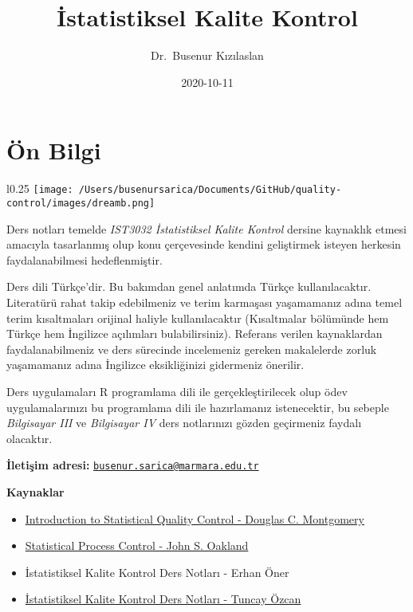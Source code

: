 \documentclass[
]{book}
\title{İstatistiksel Kalite Kontrol}
\author{Dr.~Busenur Kızılaslan}
\date{2020-10-11}
\begin{document}
\maketitle

{
\setcounter{tocdepth}{1}
\tableofcontents
}
\hypertarget{uxf6n-bilgi}{%
\chapter{Ön Bilgi}\label{uxf6n-bilgi}}



\begin{wrapfigure}{l}{0.25\textwidth}
\texttt{[image: /Users/busenursarica/Documents/GitHub/quality-control/images/dreamb.png]}
\end{wrapfigure}

Ders notları temelde \emph{IST3032 İstatistiksel Kalite Kontrol} dersine kaynaklık etmesi amacıyla tasarlanmış olup konu çerçevesinde kendini geliştirmek isteyen herkesin faydalanabilmesi hedeflenmiştir.


Ders dili Türkçe'dir. Bu bakımdan genel anlatımda Türkçe kullanılacaktır. Literatürü rahat takip edebilmeniz ve terim karmaşası yaşamamanız adına temel terim kısaltmaları orijinal haliyle kullanılacaktır (Kısaltmalar bölümünde hem Türkçe hem İngilizce açılımları bulabilirsiniz). Referans verilen kaynaklardan faydalanabilmeniz ve ders sürecinde incelemeniz gereken makalelerde zorluk yaşamamanız adına İngilizce eksikliğinizi gidermeniz önerilir.

Ders uygulamaları R programlama dili ile gerçekleştirilecek olup ödev uygulamalarınızı bu programlama dili ile hazırlamanız istenecektir, bu sebeple \emph{Bilgisayar III} ve \emph{Bilgisayar IV} ders notlarınızı gözden geçirmeniz faydalı olacaktır.

\vspace{0.3cm}

\textbf{İletişim adresi:} \href{mailto:busenur.sarica@marmara.edu.tr}{\nolinkurl{busenur.sarica@marmara.edu.tr}}

\vspace{0.3cm}

\textbf{Kaynaklar}

\begin{itemize}
\item
  \href{http://endustri.eskisehir.edu.tr/ipoyraz/TKY302/icerik/text\%20book_montgomery_6th\%20edition.pdf}{Introduction to Statistical Quality Control - Douglas C. Montgomery}
\item
  \href{http://www.diliev.com/Home/materiali/KHEA/referati/6812268-Statistical-Process-Control-eBook-VG.pdf}{Statistical Process Control - John S. Oakland}
\item
  İstatistiksel Kalite Kontrol Ders Notları - Erhan Öner
\item
  \href{http://auzefkitap.istanbul.edu.tr/kitap/endustrimuhlt_ue/istatistikselkalitekontrolu.pdf}{İstatistiksel Kalite Kontrol Ders Notları - Tuncay Özcan}
\end{itemize}
\end{document}
